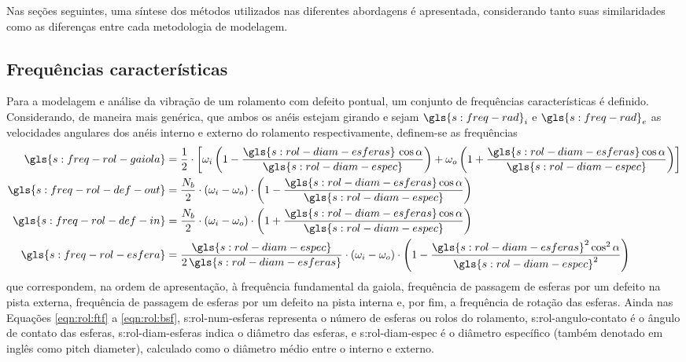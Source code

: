 \documentclass[12pt,oneside,english,brazil,lmodern,siglas,simbolos,cite=num]{ucsmonograph}
\begin{document}
	Nas seções seguintes, uma síntese dos métodos utilizados nas diferentes abordagens é apresentada, considerando tanto suas similaridades como as diferenças entre cada metodologia de modelagem.
	
	\subsection{Frequências características}
	Para a modelagem e análise da vibração de um rolamento com defeito pontual, um conjunto de frequências características é definido.
	Considerando, de maneira mais genérica, que ambos os anéis estejam girando e sejam $ \gls{s:freq-rad}_i $ e $ \gls{s:freq-rad}_e $ as velocidades angulares dos anéis interno e externo do rolamento respectivamente, definem-se as frequências \cite{sassi:2007}
	\begin{align}
		\gls{s:freq-rol-gaiola} &= \frac{1}{2}\cdot\left[ \omega_i\left(1-\frac{\gls{s:rol-diam-esferas}\,\cos\alpha}{\gls{s:rol-diam-espec}} \right) + \omega_o\left(1+\frac{\gls{s:rol-diam-esferas}\cos\alpha}{\gls{s:rol-diam-espec}} \right) \right] \label{eqn:rol:ftf}\\
		\gls{s:freq-rol-def-out} &= \frac{N_b}{2}\cdot(\omega_i-\omega_o)\cdot\left(1-\frac{\gls{s:rol-diam-esferas}\cos\alpha}{\gls{s:rol-diam-espec}} \right) \label{eqn:rol:bpfo}\\
		\gls{s:freq-rol-def-in} &= \frac{N_b}{2}\cdot(\omega_i-\omega_o)\cdot\left(1+\frac{\gls{s:rol-diam-esferas}\cos\alpha}{\gls{s:rol-diam-espec}} \right) \label{eqn:rol:bpfi}\\
		\gls{s:freq-rol-esfera} &= \frac{\gls{s:rol-diam-espec}}{2\,\gls{s:rol-diam-esferas}}\cdot(\omega_i-\omega_o)\cdot\left(1-\frac{\gls{s:rol-diam-esferas}^2\cos^2\alpha}{\gls{s:rol-diam-espec}^2} \right) \label{eqn:rol:bsf}
	\end{align}
	que correspondem, na ordem de apresentação, à frequência fundamental da gaiola, frequência de passagem de esferas por um defeito na pista externa, frequência de passagem de esferas por um defeito na pista interna e, por fim, a frequência de rotação das esferas.
	Ainda nas Equações \ref{eqn:rol:ftf} a \ref{eqn:rol:bsf}, \gls{s:rol-num-esferas} representa o número de esferas ou rolos do rolamento, \gls{s:rol-angulo-contato} é o ângulo de contato das esferas, \gls{s:rol-diam-esferas} indica o diâmetro das esferas, e \gls{s:rol-diam-espec} é o diâmetro específico (também denotado em inglês como \foreignlanguage{english}{pitch diameter}), calculado como o diâmetro médio entre o interno e externo.
	
\end{document}
